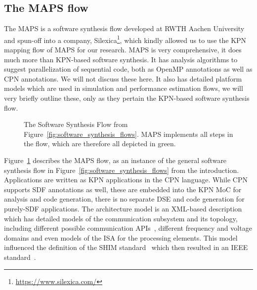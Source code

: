 \subsection{The MAPS flow}

The \acf{MAPS} is a software synthesis flow developed at RWTH Aachen University and spun-off into a company, Silexica\footnote{\url{https://www.silexica.com/}}, which kindly allowed us to use the \ac{KPN} mapping flow of \ac{MAPS} for our research.
\ac{MAPS} is very comprehensive, it does much more than \ac{KPN}-based software synthesis.
It has analysis algorithms to suggest parallelization of sequential code, both as OpenMP annotations as well as \ac{CPN} annotations. We will not discuss these here.
It also has detailed platform models which are used in simulation and performance estimation flows, we will very briefly outline these, only as they pertain the \ac{KPN}-based software synthesis flow. 

\begin{figure}[h]
	\centering
   \resizebox{0.95\textwidth}{!}{}
   \caption{The Software Synthesis Flow from Figure~\ref{fig:software_synthesis_flows}. \ac{MAPS} implements all steps in the flow, which are therefore all depicted in green.} 
	\label{fig:maps_flow}
\end{figure}

Figure~\ref{fig:maps_flow} describes the \ac{MAPS} flow, as an instance of the general software synthesis flow in Figure~\ref{fig:software_synthesis_flows} from the introduction.
Applications are written as \ac{KPN} applications in the \ac{CPN} language.
While \ac{CPN} supports \ac{SDF} annotations as well, these are embedded into the \ac{KPN} \ac{MoC} for analysis and code generation, there is no separate \ac{DSE} and code generation for purely-\ac{SDF} applications.
The architecture model is an \acs{XML}-based description which has detailed models of the communication subsystem and its topology,
including different possible communication \acsp{API}~\cite{odendahl2013split}, different frequency and voltage domains and even models of the \ac{ISA} for the processing elements.
This model influenced the definition of the SHIM standard~\cite{mca_shim15} which then resulted in an IEEE standard~\cite{ieee-2804-2019}. 
 
